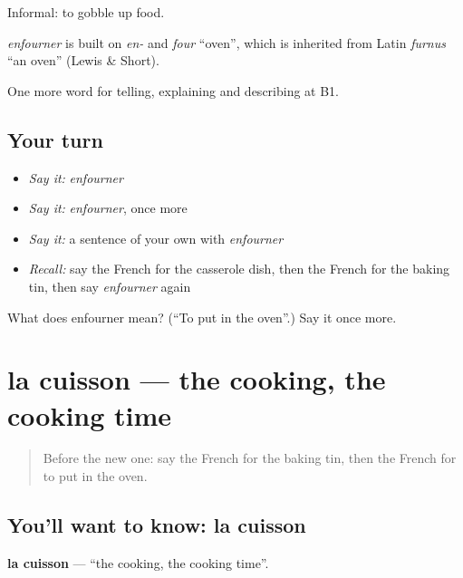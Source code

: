 Informal: to gobble up food.

\begin{cousinweb}
\emph{enfourner} is built on \emph{en-} and \emph{four} \textquotedblleft{}oven\textquotedblright{}, which is inherited from Latin \emph{furnus} \textquotedblleft{}an oven\textquotedblright{} (Lewis \& Short).
\end{cousinweb}

\begin{grammarlens}[title={What you've built}]
One more word for telling, explaining and describing at B1.
\end{grammarlens}

\subsection*{Your turn}
\begin{itemize}
\raggedright
  \item \emph{Say it:} \emph{enfourner}
  \item \emph{Say it:} \emph{enfourner}, once more
  \item \emph{Say it:} a sentence of your own with \emph{enfourner}
  \item \emph{Recall:} say the French for the casserole dish, then the French for the baking tin, then say \emph{enfourner} again
\end{itemize}

\begin{tcolorbox}[breakable,colback=teal!4,colframe=teal!35!black,title={Before you move on}]
What does enfourner mean? (\textquotedblleft{}To put in the oven\textquotedblright{}.) Say it once more.
\end{tcolorbox}
\section[la cuisson]{la cuisson — the cooking, the cooking time}

\label{lesson:FR-C331-cuisson}



\begin{quote}
Before the new one: say the French for the baking tin, then the French for to put in the oven.
\end{quote}

\subsection*{You'll want to know: la cuisson}
\textbf{la cuisson} — \textquotedblleft{}the cooking, the cooking time\textquotedblright{}.

